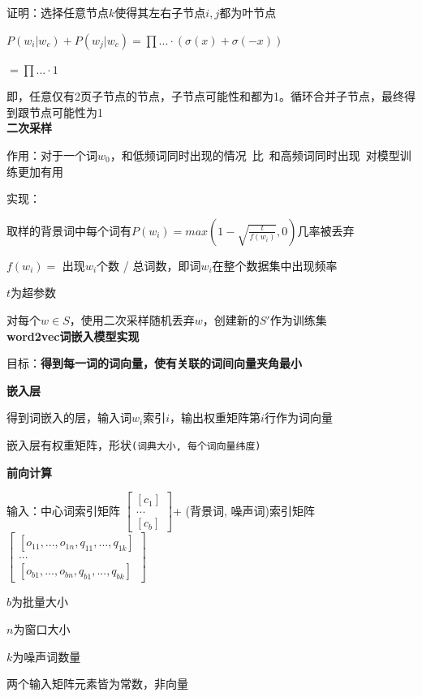 \documentclass[UTF8]{ctexart}
\begin{document}
  \quad \quad \quad 证明：选择任意节点$k$使得其左右子节点$i, j$都为叶节点

  \quad \quad \quad \quad $P(w_i | w_c) + P(w_j | w_c) = \prod ... \cdot (\sigma(x) + \sigma(-x))$

  \quad \quad \quad \quad $ = \prod ... \cdot 1$

  \quad \quad \quad \quad 即，任意仅有2页子节点的节点，子节点可能性和都为1。循环合并子节点，最终得到跟节点可能性为1\\
\textbf{二次采样}

  作用：对于一个词$w_0$，和低频词同时出现的情况\ 比\ 和高频词同时出现\ 对模型训练更加有用

  实现：
  
  \quad 取样的背景词中每个词有$P(w_i) = max(1-\sqrt{\frac{t}{f(w_i)}}, 0)$几率被丢弃

  \quad \quad $f(w_i) = $ 出现$w_i$个数 / 总词数，即词$w_i$在整个数据集中出现频率

  \quad \quad $t$为超参数

  \quad 对每个$w \in S$，使用二次采样随机丢弃$w$，创建新的$S'$作为训练集\\
\textbf{word2vec词嵌入模型实现}

  目标：\textbf{得到每一词的词向量，使有关联的词间向量夹角最小}

  \textbf{嵌入层}

  \quad 得到词嵌入的层，输入词$w_i$索引$i$，输出权重矩阵第$i$行作为词向量

  \quad 嵌入层有权重矩阵，形状\texttt{(词典大小, 每个词向量纬度)}

  \textbf{前向计算}

  \quad 输入：中心词索引矩阵
    $\begin{bmatrix}
      [c_1] \\
      ... \\
      [c_b]
      \end{bmatrix}
    $+ (背景词, 噪声词)索引矩阵
    $\begin{bmatrix}
      [o_{11}, ..., o_{1n}, q_{11}, ..., q_{1k}] \\
      ... \\
      [o_{b1}, ..., o_{bn}, q_{b1}, ..., q_{bk}]
      \end{bmatrix}
    $

  \quad \quad $b$为批量大小

  \quad \quad $n$为窗口大小

  \quad \quad $k$为噪声词数量

  \quad \quad 两个输入矩阵元素皆为常数，非向量
\end{document}
